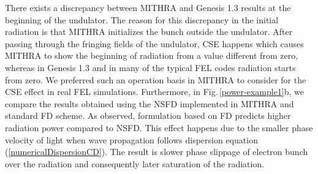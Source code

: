 There exists a discrepancy between MITHRA and Genesis 1.3 results at the beginning of the undulator.
%
The reason for this discrepancy in the initial radiation is that MITHRA initializes the bunch outside the undulator.
%
After passing through the fringing fields of the undulator, CSE happens which causes MITHRA to show the beginning of radiation from a value different from zero, whereas in Genesis 1.3 and in many of the typical FEL codes radiation starts from zero.
%
We preferred such an operation basis in MITHRA to consider for the CSE effect in real FEL simulations.
%
Furthermore, in Fig.\,\ref{power-example1}b, we compare the results obtained using the NSFD implemented in MITHRA and standard FD scheme.
%
As observed, formulation based on FD predicts higher radiation power compared to NSFD.
%
This effect happens due to the smaller phase velocity of light when wave propagation follows dispersion equation (\ref{numericalDispersionCD}).
%
The result is slower phase slippage of electron bunch over the radiation and consequently later saturation of the radiation.

